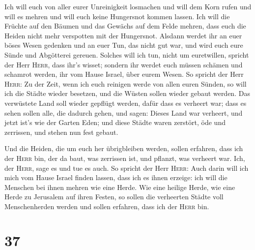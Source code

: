  Ich will euch von aller eurer Unreinigkeit losmachen und
will dem Korn rufen und will es mehren und will euch keine Hungersnot
kommen lassen.  Ich will die Früchte auf den Bäumen und
das Gewächs auf dem Felde mehren, dass euch die Heiden nicht mehr
verspotten mit der Hungersnot.  Alsdann werdet ihr an
euer böses Wesen gedenken und an euer Tun, das nicht gut war, und wird
euch eure Sünde und Abgötterei gereuen.  Solches will ich
tun, nicht um euretwillen, spricht der Herr \textsc{Herr}, dass ihr's
wisset; sondern ihr werdet euch müssen schämen und schamrot werden, ihr
vom Hause Israel, über eurem Wesen.  So spricht der Herr
\textsc{Herr}: Zu der Zeit, wenn ich euch reinigen werde von allen euren
Sünden, so will ich die Städte wieder besetzen, und die Wüsten sollen
wieder gebaut werden.  Das verwüstete Land soll wieder
gepflügt werden, dafür dass es verheert war; dass es sehen sollen alle,
die dadurch gehen,  und sagen: Dieses Land war verheert,
und jetzt ist's wie der Garten Eden; und diese Städte waren zerstört,
öde und zerrissen, und stehen nun fest gebaut.

 Und die Heiden, die um euch her übrigbleiben werden,
sollen erfahren, dass ich der \textsc{Herr} bin, der da baut, was
zerrissen ist, und pflanzt, was verheert war. Ich, der \textsc{Herr},
sage es und tue es auch.  So spricht der Herr
\textsc{Herr}: Auch darin will ich mich vom Hause Israel finden lassen,
dass ich es ihnen erzeige: ich will die Menschen bei ihnen mehren wie
eine Herde.  Wie eine heilige Herde, wie eine Herde zu
Jerusalem auf ihren Festen, so sollen die verheerten Städte voll
Menschenherden werden und sollen erfahren, dass ich der \textsc{Herr}
bin.

\hypertarget{section-36}{%
\section{37}\label{section-36}}

